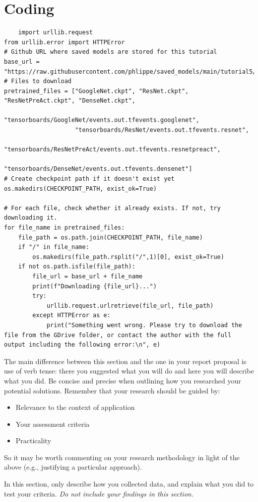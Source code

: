 \documentclass[peerreview]{IEEEtran}
\begin{document}
\section{Coding}
\begin{lstlisting}
    import urllib.request
from urllib.error import HTTPError
# Github URL where saved models are stored for this tutorial
base_url = "https://raw.githubusercontent.com/phlippe/saved_models/main/tutorial5/"
# Files to download
pretrained_files = ["GoogleNet.ckpt", "ResNet.ckpt", "ResNetPreAct.ckpt", "DenseNet.ckpt",
                    "tensorboards/GoogleNet/events.out.tfevents.googlenet",
                    "tensorboards/ResNet/events.out.tfevents.resnet",
                    "tensorboards/ResNetPreAct/events.out.tfevents.resnetpreact",
                    "tensorboards/DenseNet/events.out.tfevents.densenet"]
# Create checkpoint path if it doesn't exist yet
os.makedirs(CHECKPOINT_PATH, exist_ok=True)

# For each file, check whether it already exists. If not, try downloading it.
for file_name in pretrained_files:
    file_path = os.path.join(CHECKPOINT_PATH, file_name)
    if "/" in file_name:
        os.makedirs(file_path.rsplit("/",1)[0], exist_ok=True)
    if not os.path.isfile(file_path):
        file_url = base_url + file_name
        print(f"Downloading {file_url}...")
        try:
            urllib.request.urlretrieve(file_url, file_path)
        except HTTPError as e:
            print("Something went wrong. Please try to download the file from the GDrive folder, or contact the author with the full output including the following error:\n", e)
\end{lstlisting}
The main difference between this section and the one in your report proposal is use of verb tense: there you suggested what you will do and here you will describe what you did. Be concise and precise when outlining how you researched your potential solutions.
Remember that your research should be guided by:
\begin{itemize}
\item Relevance to the context of application
\item Your assessment criteria
\item Practicality
\end{itemize}
So it may be worth commenting on your research methodology in light of the above (e.g., justifying a particular approach).

In this section, only describe how you collected data, and explain what you did to test your criteria.  \emph{Do not include your findings in this section.}
\end{document}
